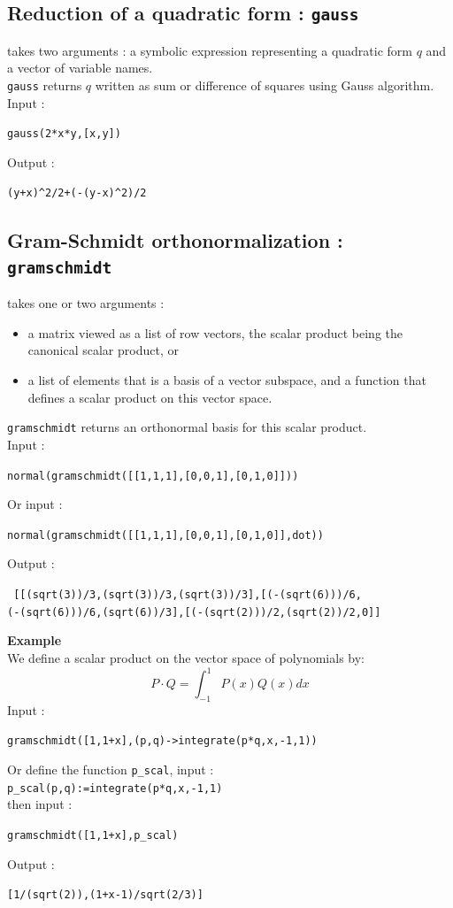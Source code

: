 \documentclass[a4paper,11pt]{book}
\begin{document}
\subsection{Reduction of a quadratic form : {\tt gauss}}
 takes two arguments : a symbolic expression
representing a quadratic form $q$ and a 
vector of variable names.\\ 
{\tt gauss} returns  $q$ written as sum or difference of squares
using Gauss algorithm.\\      
Input :
\begin{center}{\tt gauss(2*x*y,[x,y])}\end{center}
Output :
\begin{center}{\tt (y+x)\verb|^|2/2+(-(y-x)\verb|^|2)/2}\end{center}

\subsection{Gram-Schmidt orthonormalization : {\tt gramschmidt}}
 takes one or two arguments : 
\begin{itemize}
\item a matrix viewed as a list of row vectors, 
the scalar product being the canonical
  scalar product, or
\item a list of elements 
that is a basis of a vector subspace, and a function that defines a scalar 
product on this vector space.
\end{itemize}
{\tt gramschmidt} returns an orthonormal basis for this scalar product.\\ 
Input :
\begin{center}{\tt normal(gramschmidt([[1,1,1],[0,0,1],[0,1,0]]))}\end{center}
Or input :
\begin{center}{\tt normal(gramschmidt([[1,1,1],[0,0,1],[0,1,0]],dot))}\end{center}
Output :
\begin{center}{\tt
[[(sqrt(3))/3,(sqrt(3))/3,(sqrt(3))/3],[(-(sqrt(6)))/6,}\\
  {\tt (-(sqrt(6)))/6,(sqrt(6))/3],[(-(sqrt(2)))/2,(sqrt(2))/2,0]]}\end{center}
  {\bf Example}\\
We define a scalar product on the vector space of 
polynomials by: 
$$P\cdot Q=\int_{-1}^1P(x) Q(x)dx $$
Input :
 \begin{center}{\tt gramschmidt([1,1+x],(p,q)->integrate(p*q,x,-1,1))}\end{center}
Or define the function {\tt p\_scal}, input :\\
{\tt p\_scal(p,q):=integrate(p*q,x,-1,1)}\\
then input :
\begin{center}{\tt gramschmidt([1,1+x],p\_scal)}\end{center}
Output :
\begin{center}{\tt [1/(sqrt(2)),(1+x-1)/sqrt(2/3)]}\end{center}
\end{document}
